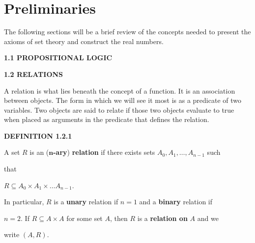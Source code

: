\documentclass[12pt, a4paper]{article}
\begin{document}
\section{Preliminaries}
\hline

\vspace{8mm}


\noindent The following sections will be a brief review of the concepts needed to present the axioms of set theory and construct the real numbers.\par

\vspace{10mm}

\noindent\large{\textbf{1.1 PROPOSITIONAL LOGIC}}\normalsize\par

\vspace{10mm}

\noindent\large{\textbf{1.2 RELATIONS}}\normalsize\par

\vspace{4mm}

\noindent A relation is what lies beneath the concept of a function. It is an association between objects. The form in which we will see it most is as a predicate of two variables. Two objects are said to relate if those two objects evaluate to true when placed as arguments in the predicate that defines the relation.\par

\vspace{6mm}

\noindent\blacksquare\textbf{ DEFINITION 1.2.1}\par

\vspace{4mm}

A set $R$ is an ($\mathbf{n}$\textbf{-ary}) \textbf{relation} if there exists sets $A_0,A_1,\ldots,A_{n-1}$ such\par that\par

\vspace{4mm}

\centerline{$R\subseteq A_0\times A_1\times\dots A_{n-1}$.}

\vspace{4mm}

In particular, $R$ is a \textbf{unary} relation if $n=1$ and a \textbf{binary} relation if\par$n=2$. If $R\subseteq A\times A$ for some set $A$, then $R$ is a \textbf{relation on} $A$ and we\par write $(A,R)$.\par
\end{document}
